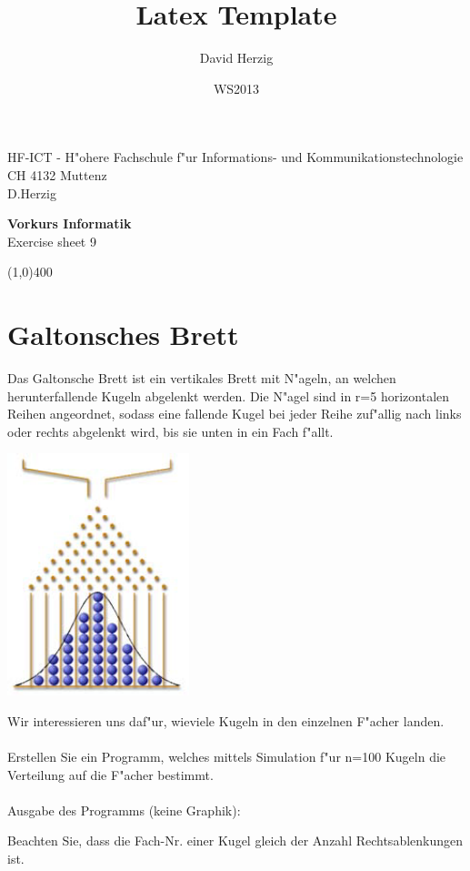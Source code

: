 \documentclass[a4paper,10pt]{article}
\title{Latex Template}
\author{David Herzig}
\date{WS2013}
\begin{document}
HF-ICT - H"ohere Fachschule f"ur Informations- und Kommunikationstechnologie\\
CH 4132 Muttenz\\
D.Herzig

\vspace{2mm}

\begin{center}
{\Large \bf Vorkurs Informatik}\\
Exercise sheet 9
\end{center}

\vspace{2mm}

\line(1,0){400}

\vspace{5mm}

\section{Galtonsches Brett}
Das Galtonsche Brett ist ein vertikales Brett mit N"ageln, an welchen herunterfallende Kugeln abgelenkt werden. Die N"agel sind in r=5 horizontalen Reihen angeordnet, sodass eine fallende Kugel bei jeder Reihe zuf"allig nach links oder rechts abgelenkt wird, bis sie unten in ein Fach f"allt.

\vspace{5mm}

\begin{center}
\includegraphics[width=150pt]{galton.png}
\end{center}

\vspace{5mm}

Wir interessieren uns daf"ur, wieviele Kugeln in den einzelnen F"acher landen.\\
\\
Erstellen Sie ein Programm, welches mittels Simulation f"ur n=100 Kugeln die Verteilung auf die F"acher bestimmt.\\
\\
Ausgabe des Programms (keine Graphik):



Beachten Sie, dass die Fach-Nr. einer Kugel gleich der Anzahl Rechtsablenkungen ist.
\end{document}
